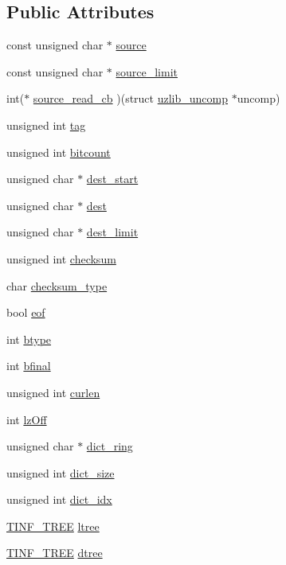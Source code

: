 \subsection*{Public Attributes}
\begin{DoxyCompactItemize}
\item 
const unsigned char $\ast$ \hyperlink{structuzlib__uncomp_a88c09a94bc3e1d08ba10575c0723f4d0}{source}
\item 
const unsigned char $\ast$ \hyperlink{structuzlib__uncomp_a2997b62eae694dbc2bbe18bd4eefded9}{source\+\_\+limit}
\item 
int($\ast$ \hyperlink{structuzlib__uncomp_a7ad7d067f6c27397a5a88498cf8af527}{source\+\_\+read\+\_\+cb} )(struct \hyperlink{structuzlib__uncomp}{uzlib\+\_\+uncomp} $\ast$uncomp)
\item 
unsigned int \hyperlink{structuzlib__uncomp_aba6db88f0dd800fccdbed95ac9b04aad}{tag}
\item 
unsigned int \hyperlink{structuzlib__uncomp_a71ee97b40084423b0c8581ed394b9616}{bitcount}
\item 
unsigned char $\ast$ \hyperlink{structuzlib__uncomp_aec0e8c2dcaa5b0a2a1dd218e0c05de54}{dest\+\_\+start}
\item 
unsigned char $\ast$ \hyperlink{structuzlib__uncomp_a4d206d8fbb276791b9af2e631e1407d9}{dest}
\item 
unsigned char $\ast$ \hyperlink{structuzlib__uncomp_a36cce8c657a49b74b87942dfae7b3a2b}{dest\+\_\+limit}
\item 
unsigned int \hyperlink{structuzlib__uncomp_a583a13ed4063dc11a9fe617e877d0094}{checksum}
\item 
char \hyperlink{structuzlib__uncomp_a76b5a2e8620322b737b4c5cf3a2128bb}{checksum\+\_\+type}
\item 
bool \hyperlink{structuzlib__uncomp_a5e7004eef44440538d30d39455d73ae8}{eof}
\item 
int \hyperlink{structuzlib__uncomp_a449050defdbad5560acb25708626c97a}{btype}
\item 
int \hyperlink{structuzlib__uncomp_a5d6bdf4ecd6576c5a1a29766cdace553}{bfinal}
\item 
unsigned int \hyperlink{structuzlib__uncomp_af58ab3437eed3ea209886dc61aabac83}{curlen}
\item 
int \hyperlink{structuzlib__uncomp_a290337c263cc23cbe52683e823f99015}{lz\+Off}
\item 
unsigned char $\ast$ \hyperlink{structuzlib__uncomp_ab5f6528f28e47ea478ebb2921f7edbbb}{dict\+\_\+ring}
\item 
unsigned int \hyperlink{structuzlib__uncomp_aa323c8e2935d53e60074111ccf3c4ad4}{dict\+\_\+size}
\item 
unsigned int \hyperlink{structuzlib__uncomp_a400605e91911bf001e476b7a662cf457}{dict\+\_\+idx}
\item 
\hyperlink{structTINF__TREE}{T\+I\+N\+F\+\_\+\+T\+R\+EE} \hyperlink{structuzlib__uncomp_aa80715fb83c3b331088f2224982f0428}{ltree}
\item 
\hyperlink{structTINF__TREE}{T\+I\+N\+F\+\_\+\+T\+R\+EE} \hyperlink{structuzlib__uncomp_a5ea60a76a4c1d45958e44fc6658c937a}{dtree}
\end{DoxyCompactItemize}


